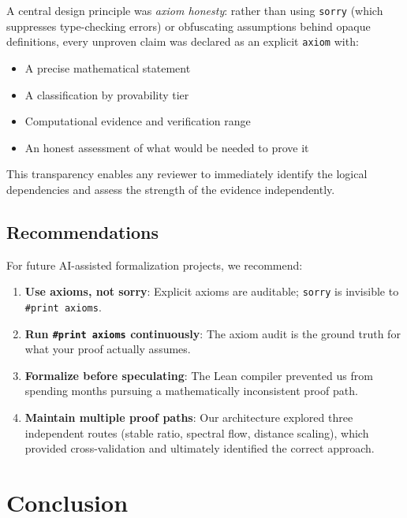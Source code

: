 \documentclass[11pt,a4paper]{article}
\theoremstyle{definition}
\theoremstyle{remark}
\begin{document}
A central design principle was \emph{axiom honesty}: rather than using
\texttt{sorry} (which suppresses type-checking errors) or obfuscating
assumptions behind opaque definitions, every unproven claim was declared
as an explicit \texttt{axiom} with:

\begin{itemize}
  \item A precise mathematical statement
  \item A classification by provability tier
  \item Computational evidence and verification range
  \item An honest assessment of what would be needed to prove it
\end{itemize}

This transparency enables any reviewer to immediately identify the
logical dependencies and assess the strength of the evidence independently.

\subsection{Recommendations}

For future AI-assisted formalization projects, we recommend:

\begin{enumerate}
  \item \textbf{Use axioms, not sorry}: Explicit axioms are auditable;
    \texttt{sorry} is invisible to \texttt{\#print axioms}.

  \item \textbf{Run \texttt{\#print axioms} continuously}: The axiom
    audit is the ground truth for what your proof actually assumes.

  \item \textbf{Formalize before speculating}: The Lean compiler
    prevented us from spending months pursuing a mathematically
    inconsistent proof path.

  \item \textbf{Maintain multiple proof paths}: Our architecture
    explored three independent routes (stable ratio, spectral flow,
    distance scaling), which provided cross-validation and ultimately
    identified the correct approach.
\end{enumerate}

\section{Conclusion}\label{sec:conclusion}
\end{document}
